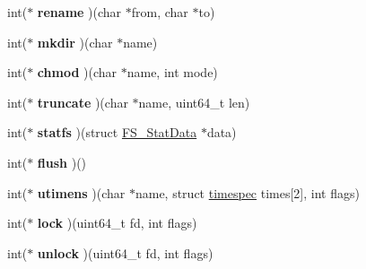 \begin{DoxyCompactItemize}
\item 
int($\ast$ {\bfseries rename} )(char $\ast$from, char $\ast$to)\hypertarget{structcserver__handlers_a3461ca8be30e7a75cb0e05a46979c661}{}\label{structcserver__handlers_a3461ca8be30e7a75cb0e05a46979c661}

\item 
int($\ast$ {\bfseries mkdir} )(char $\ast$name)\hypertarget{structcserver__handlers_a4230a70360165a49de677dace0ca29f8}{}\label{structcserver__handlers_a4230a70360165a49de677dace0ca29f8}

\item 
int($\ast$ {\bfseries chmod} )(char $\ast$name, int mode)\hypertarget{structcserver__handlers_a8b3ea34667be74fb89268ca9265b7719}{}\label{structcserver__handlers_a8b3ea34667be74fb89268ca9265b7719}

\item 
int($\ast$ {\bfseries truncate} )(char $\ast$name, uint64\+\_\+t len)\hypertarget{structcserver__handlers_a67d2addc08b437fec9ce6156e43723a9}{}\label{structcserver__handlers_a67d2addc08b437fec9ce6156e43723a9}

\item 
int($\ast$ {\bfseries statfs} )(struct \hyperlink{structFS__StatData}{F\+S\+\_\+\+Stat\+Data} $\ast$data)\hypertarget{structcserver__handlers_ae44729358a48364f6753e13bd09fa527}{}\label{structcserver__handlers_ae44729358a48364f6753e13bd09fa527}

\item 
int($\ast$ {\bfseries flush} )()\hypertarget{structcserver__handlers_ab656eca32877f4def80c5236e71cff75}{}\label{structcserver__handlers_ab656eca32877f4def80c5236e71cff75}

\item 
int($\ast$ {\bfseries utimens} )(char $\ast$name, struct \hyperlink{structtimespec}{timespec} times\mbox{[}2\mbox{]}, int flags)\hypertarget{structcserver__handlers_a4eee43e305106238004465299099b3bb}{}\label{structcserver__handlers_a4eee43e305106238004465299099b3bb}

\item 
int($\ast$ {\bfseries lock} )(uint64\+\_\+t fd, int flags)\hypertarget{structcserver__handlers_ad28443ebc4e68aa45db581156d84bc28}{}\label{structcserver__handlers_ad28443ebc4e68aa45db581156d84bc28}

\item 
int($\ast$ {\bfseries unlock} )(uint64\+\_\+t fd, int flags)\hypertarget{structcserver__handlers_ad116bfe8d280226896c56ecfbb305117}{}\label{structcserver__handlers_ad116bfe8d280226896c56ecfbb305117}


\end{DoxyCompactItemize}
